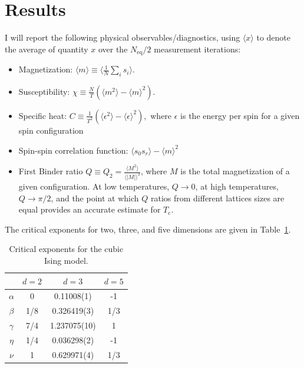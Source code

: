 \documentclass[11pt, oneside]{article}
\begin{document}
\section{Results}
I will report the following physical observables/diagnostics, using $\langle{x}\rangle$ to denote the average of quantity $x$ over the $N_\text{eq}/2$ measurement iterations:
\begin{itemize}
	\item{Magnetization: $\langle{m}\rangle\equiv\langle\frac1{N}\sum_is_i\rangle$.}
	\item{Susceptibility: $\chi\equiv\frac{N}{T}(\langle{m^2}\rangle-\langle{m}\rangle^2)$.}
	\item{Specific heat: $C\equiv\frac{1}{T^2}(\langle{\epsilon^2}\rangle-\langle{\epsilon}\rangle^2),$ where $\epsilon$ is the energy per spin for a given spin configuration}
	\item{Spin-spin correlation function: $\langle{s_0s_r}\rangle-\langle{m}\rangle^2$}
	\item{First Binder ratio $Q\equiv Q_2=\frac{\langle{M^2}\rangle}{\langle{|M|}\rangle^2}$, where $M$ is the total magnetization of a given configuration. At low temperatures, $Q\to0$, at high temperatures, $Q\to\pi/2$, and the point at which $Q$ ratios from different lattices sizes are equal provides an accurate estimate for $T_\text{c}$.}
\end{itemize}
The critical exponents for two, three, and five dimensions are given in Table~\ref{tab:crit}.
\begin{table}[H]
\centering
\caption{Critical exponents for the cubic Ising model.}
\label{tab:crit}
\begin{tabular}{|c|c|c|c|}
\hline
 & $d=2$ & $d=3$ & $d=5$ \\ \hline
$\alpha$  & 0              & 0.11008(1)     & -1             \\ \hline
$\beta$   & 1/8            & 0.326419(3)    & 1/3            \\ \hline
$\gamma$  & 7/4            & 1.237075(10)   & 1              \\ \hline
$\eta$     & 1/4            & 0.036298(2)    & -1             \\ \hline
$\nu$     & 1              & 0.629971(4)    & 1/3            \\ \hline
\end{tabular}
\end{table}
\end{document}
